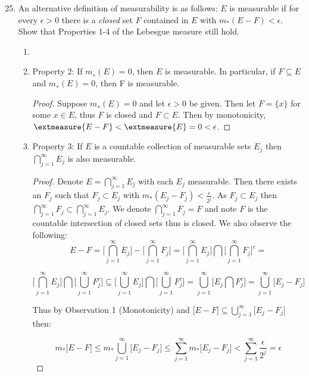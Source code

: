 \documentclass[letterpaper]{article}
\begin{document}
\begin{enumerate}
    \setcounter{enumi}{24}
    \item An alternative definition of measurability is as follows: $E$ is measurable if for every $\epsilon >0$ there is a \textit{closed} set $F$ contained in $E$ with $m_*(E-F) < \epsilon.$ Show that Properties 1-4 of the Lebesgue measure still hold.
    \begin{enumerate}[label=(\alph*)]
    \item{}
    \item{} Property 2: If $m_{∗}(E)=0$, then $E$ is measurable. In particular, if $F\subseteq E$ and $m_∗(E) = 0$, then F is measurable.
    \begin{proof}
    Suppose $m_{∗}(E)=0$ and let $\epsilon>0$ be given. Then let $F=\{x\}$ for some $x\in E$, thus $F$ is closed and $F\subset E$. Then by monotonicity, $\extmeasure{E-F}<\extmeasure{E}=0<\epsilon$.
    \end{proof}
    \item{} Property 3: If $E$ is a countable collection of measurable sets $E_j$ then $\bigcap_{j=1}^\infty E_j$ is also measurable.
    \begin{proof}
    Denote $E=\bigcap_{j=1}^\infty E_j$ with each $E_j$ measurable.  Then there exists an $F_j$ such that $F_j \subset E_j$ with $m_*(E_j - F_j) < \frac{\epsilon}{2^j}$.  As $F_j \subset E_j$ then $\bigcap_{j=1}^\infty F_j \subset \bigcap_{j=1}^\infty E_j$.   We denote $\bigcap_{j=1}^\infty F_j = F$ and note $F$ is the countable intersection of closed sets thus is closed.  We also observe the following:
    $$E-F = \bigg[\bigcap_{j=1}^\infty E_j\bigg]  - \bigg[\bigcap_{j=1}^\infty F_j\bigg] = \bigg[\bigcap_{j=1}^\infty E_j\bigg] \bigcap \bigg[\bigcap_{j=1}^\infty F_j\bigg]^c =$$

    $$\bigg[\bigcap_{j=1}^\infty E_j\bigg]\bigcap \bigg[ \bigcup_{j=1}^\infty F_j^c\bigg] \subseteq \bigg[\bigcup_{j=1}^\infty E_j\bigg] \bigcap \bigg[ \bigcup_{j=1}^\infty F_j^c \bigg] = \bigcup_{j=1}^\infty \big[E_j \bigcap F_j^c\big] = \bigcup_{j=1}^\infty \big[E_j - F_j\big]
    $$

    Thus by Observation 1 (Monotonicity) and $\big[E-F\big] \subseteq \bigcup_{j=1}^\infty \big[E_j - F_j\big]$ then:

    $$m_*\big[E-F\big] \leq m_*\bigcup_{j=1}^\infty \big[E_j - F_j\big] \leq \sum^\infty_{j=1}m_*\big[E_j - F_j\big] < \sum^\infty_{j=1} \frac{\epsilon}{2^j} = \epsilon$$


\end{proof}
\end{enumerate}
\end{enumerate}
\end{document}
